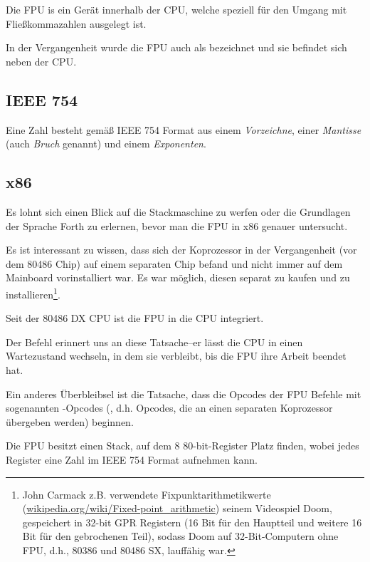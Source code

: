 \mysection{\FPUChapterName}
\label{sec:FPU}

Die \ac{FPU} is ein Gerät innerhalb der \ac{CPU}, welche speziell für den Umgang
mit Fließkommazahlen ausgelegt ist. 

In der Vergangenheit wurde die \ac{FPU} auch als  bezeichnet und
sie befindet sich neben der \ac{CPU}. 

\subsection{IEEE 754}

Eine Zahl besteht gemäß IEEE 754 Format aus einem \emph{Vorzeichne}, einer
\emph{Mantisse} (auch \emph{Bruch} genannt) und einem \emph{Exponenten}. 

\subsection{x86}

Es lohnt sich einen Blick auf die Stackmaschine zu werfen oder die
Grundlagen der Sprache Forth zu erlernen, bevor man die \ac{FPU} in
x86 genauer untersucht. 

Es ist interessant zu wissen, dass sich der Koprozessor in der Vergangenheit
(vor dem 80486 Chip) auf einem separaten Chip befand und nicht immer auf dem
Mainboard vorinstalliert war. Es war möglich, diesen separat zu kaufen und zu
installieren\footnote{John Carmack z.B. verwendete Fixpunktarithmetikwerte 
(\href{http://go.yurichev.com/17356}{wikipedia.org/wiki/Fixed-point\_arithmetic})
seinem Videospiel Doom, gespeichert in 32-bit \ac{GPR} Registern (16 Bit
für den Hauptteil und weitere 16 Bit für den gebrochenen Teil), sodass Doom
auf 32-Bit-Computern ohne FPU, d.h., 80386 und 80486 SX, lauffähig war.}.

Seit der 80486 DX CPU ist die \ac{FPU} in die \ac{CPU} integriert.

Der Befehl  erinnert uns an diese Tatsache--er lässt die \ac{CPU} in
einen Wartezustand wechseln, in dem sie verbleibt, bis die \ac{FPU} ihre Arbeit
beendet hat.

Ein anderes Überbleibsel ist die Tatsache, dass die Opcodes der \ac{FPU} Befehle
mit sogenannten -Opcodes (, d.h. Opcodes, die an einen
separaten Koprozessor übergeben werden) beginnen.

\label{FPU_is_stack}
Die FPU besitzt einen Stack, auf dem 8 80-bit-Register Platz finden, wobei jedes
Register eine Zahl im IEEE 754 Format aufnehmen kann.


